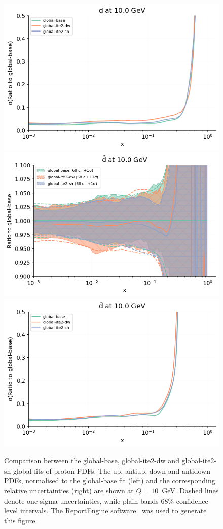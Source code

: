 \documentclass[11pt,a4paper]{article}
\begin{document}
\begin{figure}[!t]
\includegraphics[width=0.49\linewidth]{plots/uncertainty_d.png}\\
\includegraphics[width=0.49\linewidth]{plots/proton_pdf_dbar.png}
\includegraphics[width=0.49\linewidth]{plots/uncertainty_dbar.png}\\
\caption{Comparison between the global-base, global-ite2-dw and global-ite2-sh
  global fits of proton PDFs. The up, antiup, down and antidown PDFs,
  normalised to the global-base fit (left) and the corresponding relative
  uncertainties (right) are shown at $Q=10$~GeV.  Dashed lines denote
one sigma uncertainties, while plain bands 68\% confidence level intervals. 
The {\sc ReportEngine} software~\cite{zahari_kassabov_2019_2571601} was used to
generate this figure.}
\label{fig:proton_pdfs}
\end{figure}
\end{document}
